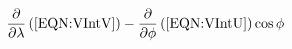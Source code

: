 
\begin{equation}
    \frac{\partial}{\partial \lambda}\left(\ref{EQN:VIntV}\right)-\frac{\partial}{\partial \phi}\left(\ref{EQN:VIntU}\right)\cos\phi
\label{EQN:CrossDifferential}
\end{equation}
